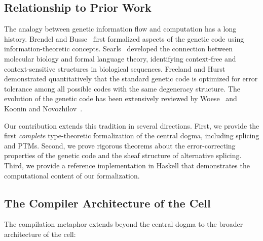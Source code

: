 \documentclass[12pt,a4paper]{article}
\theoremstyle{definition}
\begin{document}
\subsection{Relationship to Prior Work}

The analogy between genetic information flow and computation has a long history.
Brendel and Busse~\cite{brendel1984} first formalized aspects of the genetic code using information-theoretic concepts.
Searls~\cite{searls2002} developed the connection between molecular biology and formal language theory, identifying context-free and context-sensitive structures in biological sequences.
Freeland and Hurst~\cite{freeland1998} demonstrated quantitatively that the standard genetic code is optimized for error tolerance among all possible codes with the same degeneracy structure.
The evolution of the genetic code has been extensively reviewed by Woese~\cite{woese1965} and Koonin and Novozhilov~\cite{koonin2009}.

Our contribution extends this tradition in several directions.
First, we provide the first \emph{complete} type-theoretic formalization of the central dogma, including splicing and PTMs.
Second, we prove rigorous theorems about the error-correcting properties of the genetic code and the sheaf structure of alternative splicing.
Third, we provide a reference implementation in Haskell that demonstrates the computational content of our formalization.

\subsection{The Compiler Architecture of the Cell}

The compilation metaphor extends beyond the central dogma to the broader architecture of the cell:
\end{document}
